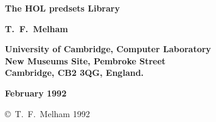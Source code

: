 
\begin{titlepage}

\setcounter{page}{1}		          %


\mbox{}
\vskip20mm
\begin{center}
{\Huge\bf The HOL pred{\und}sets Library}
\end{center}


\vskip15mm
\begin{center}
\large\bf T.\ F.\ Melham
\end{center}


\vfill
\begin{center}
\bf
University of Cambridge, Computer Laboratory\\
New Museums Site, Pembroke Street\\
Cambridge, {\small\bf CB}2 3{\small\bf QG}, England.
\end{center}


\vskip5mm
\begin{center}
\bf February 1992
\end{center}

\end{titlepage}

\thispagestyle{empty}
\mbox{}

\vfill
\begin{center}
\copyright\ T.\ F.\ Melham 1992
\end{center}
\newpage
